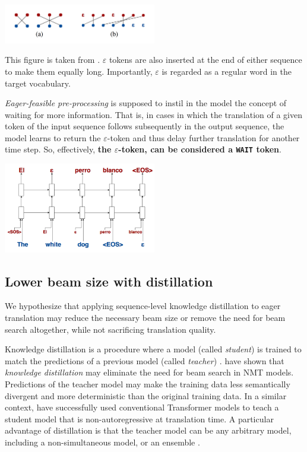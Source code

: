 \documentclass[english]{uzhpub}
\begin{document}
\begin{center}
    \includegraphics[width=0.5\textwidth]{eager_data.png}
\end{center}

This figure is taken from \cite{youmaynotneedattention}. $\varepsilon$ tokens are also inserted at the end of either sequence to make them equally long. Importantly, $\varepsilon$ is regarded as a regular word in the target vocabulary.

\textit{Eager-feasible pre-processing} is supposed to instil in the model the concept of waiting for more information. That is, in cases in which the translation of a given token of the input sequence follows subsequently in the output sequence, the model learns to return the $\varepsilon$-token and thus delay further translation for another time step. So, effectively, \textbf{the $\varepsilon$-token, can be considered a \texttt{WAIT} token}.

\begin{center}
    \includegraphics[width=0.5\textwidth]{eager_decode.png}
\end{center}

\subsection{Lower beam size with distillation}

We hypothesize that applying sequence-level knowledge distillation to eager translation may reduce the necessary beam size or remove the need for beam search altogether, while not sacrificing translation quality. 

Knowledge distillation is a procedure where a model (called \textit{student}) is trained to match the predictions of a previous model (called \textit{teacher}) \cite{hinton2015distilling}. \cite{kim2016sequence} have shown that \textit{knowledge distillation} may eliminate the need for beam search in NMT models. Predictions of the teacher model may make the training data less semantically divergent \cite{vyas-etal-2018-identifying} and more deterministic \cite{gu2017non} than the original training data. In a similar context, \cite{gu2017non} have successfully used conventional Transformer models to teach a student model that is non-autoregressive at translation time. A particular advantage of distillation is that the teacher model can be any arbitrary model, including a non-simultaneous model, or an ensemble \cite{freitag2017ensemble}.
\end{document}
